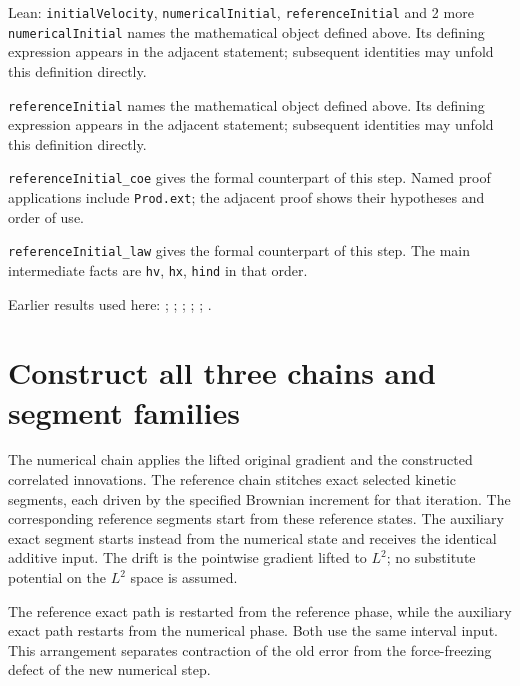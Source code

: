 \documentclass[11pt,a4paper]{article}
\begin{document}
\begin{leanbox}{Lean: \texttt{initialVelocity}, \texttt{numericalInitial}, \texttt{referenceInitial} and 2 more}
\texttt{numerical\allowbreak{}Initial} names the mathematical object defined above. Its defining expression appears in the adjacent statement; subsequent identities may unfold this definition directly.




\texttt{reference\allowbreak{}Initial} names the mathematical object defined above. Its defining expression appears in the adjacent statement; subsequent identities may unfold this definition directly.




\texttt{reference\allowbreak{}Initial\_\allowbreak{}coe} gives the formal counterpart of this step. Named proof applications include \texttt{Prod.\allowbreak{}ext}; the adjacent proof shows their hypotheses and order of use.




\texttt{reference\allowbreak{}Initial\_\allowbreak{}law} gives the formal counterpart of this step. The main intermediate facts are \texttt{hv}, \texttt{hx}, \texttt{hind} in that order.
\end{leanbox}


Earlier results used here: \cite[Section~3.17.1]{LangevinLean2026ULASC}; \cite[Section~3.17.2]{LangevinLean2026ULASC}; \cite[Section~3.22.17]{LangevinLean2026ULASC}; \cite[Section~3.22.19]{LangevinLean2026ULASC}; \cite[Section~3.22.20]{LangevinLean2026ULASC}; \cite[Section~3.22.6]{LangevinLean2026ULASC}.

\section{\texorpdfstring{Construct all three chains and segment families}{Construct all three chains and segment families}}


The numerical chain applies the lifted original gradient and the constructed correlated innovations. The reference chain stitches exact selected kinetic segments, each driven by the specified Brownian increment for that iteration. The corresponding reference segments start from these reference states. The auxiliary exact segment starts instead from the numerical state and receives the identical additive input. The drift is the pointwise gradient lifted to \(L^{2}\); no substitute potential on the \(L^{2}\) space is assumed.



The reference exact path is restarted from the reference phase, while the auxiliary exact path restarts from the numerical phase. Both use the same interval input. This arrangement separates contraction of the old error from the force-freezing defect of the new numerical step.
\end{document}
